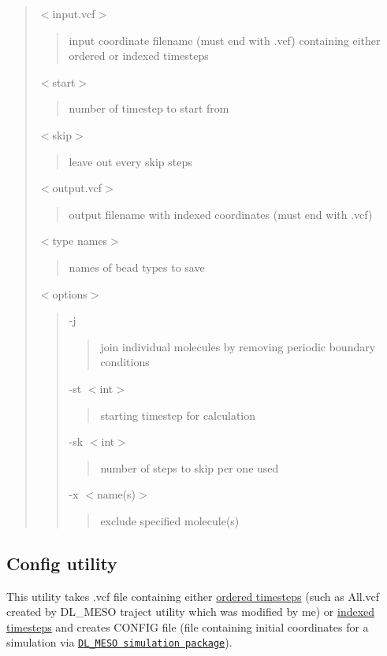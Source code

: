 \begin{quote}
{\ttfamily $<$input.\+vcf$>$} \begin{quote}
input coordinate filename (must end with {\ttfamily .vcf}) containing either ordered or indexed timesteps \end{quote}
{\ttfamily $<$start$>$} \begin{quote}
number of timestep to start from \end{quote}
{\ttfamily $<$skip$>$} \begin{quote}
leave out every {\ttfamily skip} steps \end{quote}
{\ttfamily $<$output.\+vcf$>$} \begin{quote}
output filename with indexed coordinates (must end with {\ttfamily .vcf}) \end{quote}
{\ttfamily $<$type names$>$} \begin{quote}
names of bead types to save \end{quote}
{\ttfamily $<$options$>$} \begin{quote}
{\ttfamily -\/j} \begin{quote}
join individual molecules by removing periodic boundary conditions \end{quote}
{\ttfamily -\/st $<$int$>$} \begin{quote}
starting timestep for calculation \end{quote}
{\ttfamily -\/sk $<$int$>$} \begin{quote}
number of steps to skip per one used \end{quote}
{\ttfamily -\/x $<$name(s)$>$} \begin{quote}
exclude specified molecule(s) \end{quote}
\end{quote}
\end{quote}
\hypertarget{Common_Config}{}\subsection{Config utility}\label{Common_Config}
This utility takes {\ttfamily .vcf} file containing either \hyperlink{InputFiles_OrderedCoorFile}{ordered timesteps} (such as {\ttfamily All.\+vcf} created by D\+L\+\_\+\+M\+E\+SO {\ttfamily traject} utility which was modified by me) or \hyperlink{InputFiles_IndexedCoorFile}{indexed timesteps} and creates {\ttfamily C\+O\+N\+F\+IG} file (file containing initial coordinates for a simulation via \href{http://www.scd.stfc.ac.uk//research/app/ccg/software/DL_MESO/40694.aspx}{\tt D\+L\+\_\+\+M\+E\+SO simulation package}).

